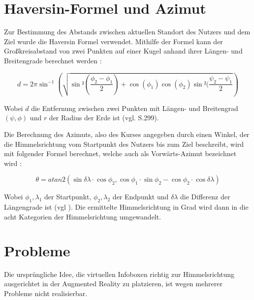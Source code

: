 \section{Haversin-Formel und Azimut}

Zur Bestimmung des Abstands zwischen aktuellen Standort des Nutzers und dem Ziel wurde die Haversin Formel verwendet. Mithilfe der Formel kann der Großkreisabstand von zwei Punkten auf einer Kugel anhand ihrer Längen- und Breitengrade berechnet werden \cite{haversine}: 

\begin{equation}
d = 2 \pi \sin^{-1} (\sqrt{\sin²(\frac{\phi_2 - \phi_1}{2})+\cos(\phi_1)\cos(\phi_2)\sin²(\frac{\psi_2-\psi_1}{2}})
\end{equation}

Wobei $d$ die Entfernung zwischen zwei Punkten mit Längen- und Breitengrad $(\psi,\phi)$ und $r$ der Radius der Erde ist (vgl. \cite{haversine} S.299).

Die Berechnung des Azimuts, also des Kurses angegeben durch einen Winkel, der die Himmelsrichtung vom Startpunkt des Nutzers bis zum Ziel beschreibt, wird mit folgender Formel berechnet, welche auch als \glqq Vorwärts-Azimut\grqq{} bezeichnet wird \cite{bearing}:

\begin{equation}
\theta = atan2(\sin \delta\lambda \cdot\cos\phi_2, \cos \phi_1 \cdot\sin\phi_2 - \cos\phi_2 \cdot\cos\delta\lambda)
\end{equation}

Wobei $\phi_1,\lambda_1$ der Startpunkt, $\phi_2,\lambda_2$ der Endpunkt und $\delta\lambda$   die Differenz der Längengrade ist (vgl \cite{bearing}). Die ermittelte Himmelsrichtung in Grad wird dann in die acht Kategorien der Himmelsrichtung umgewandelt.

\section{Probleme}

Die ursprüngliche Idee, die virtuellen Infoboxen richtig zur Himmelsrichtung ausgerichtet in der Augmented Reality zu platzieren, ist wegen mehrerer Probleme nicht realisierbar.

